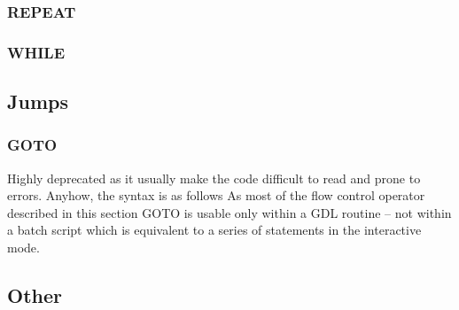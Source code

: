 \subsubsection{REPEAT%
}
\subsubsection{WHILE%
}
\subsection{Jumps}
\subsubsection{GOTO}
Highly deprecated as it usually make the code difficult to read
  and prone to errors.
Anyhow, the syntax is as follows
As most of the flow control operator described in this section GOTO
  is usable only within a GDL routine -- not within a batch script
  which is equivalent to a series of statements in the interactive mode.

\subsection{Other}
